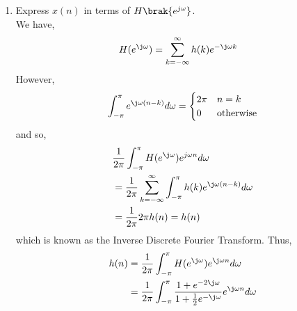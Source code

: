 \documentclass[journal,12pt,twocolumn]{IEEEtran}
\renewcommand\thesection{\arabic{section}}
\begin{document}
\begin{enumerate}[label=\thesection.\arabic*]
\item Express $x(n)$ in terms of $H\brak{e^{j \omega}}$.\\
\solution We have,
\begin{align}
	H(e^{\j\omega}) &= \sum_{k = -\infty}^{\infty}h(k)e^{-\j\omega k}
\end{align}
However,
\begin{align}
	\int_{-\pi}^{\pi}e^{\j\omega(n - k)}d\omega =
	\begin{cases}
		2\pi & n = k \\
		0 & \textrm{otherwise}
	\end{cases}
\end{align}
and so,
\begin{align}
	&\frac{1}{2\pi}\int_{-\pi}^{\pi}H(e^{\j\omega})e^{j\omega n}d\omega \\
	&= \frac{1}{2\pi}\sum_{k = -\infty}^{\infty}\int_{-\pi}^{\pi}h(k)e^{\j\omega(n - k)}d\omega \\
	&= \frac{1}{2\pi}2\pi h(n) = h(n)
\end{align}
which is known as the Inverse Discrete Fourier Transform. Thus,
\begin{align}
	h(n) &= \frac{1}{2\pi}\int_{-\pi}^{\pi}H(e^{\j\omega})e^{\j\omega n}d\omega \\
		 &= \frac{1}{2\pi}\int_{-\pi}^{\pi}\frac{1 + e^{-2\j\omega}}{1 + \frac{1}{2}e^{-\j\omega}}e^{\j\omega n}d\omega
	\label{eq:idtft}
\end{align}



\end{enumerate}
\end{document}
